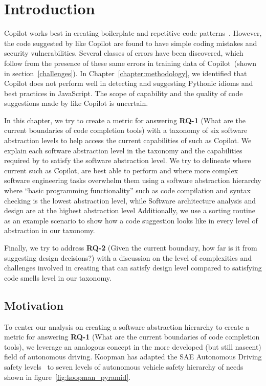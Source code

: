 \label{chapter:framework}

\section{Introduction}
Copilot works best in creating boilerplate and repetitive code patterns~\cite{Copilot-web}.
However, the code suggested by \cct{} like Copilot are found to have simple coding mistakes and security vulnerabilities. Several classes of errors have been discovered, which follow from the presence of these same errors in training data of Copilot~(shown in section~\ref{challenges}).
In Chapter~\ref{chapter:methodology}, we identified that Copilot does not perform well in detecting and suggesting Pythonic idioms and best practices in JavaScript.
The scope of capability and the quality of code suggestions made by \cct{} like Copilot is uncertain. 

In this chapter, we try to create a metric for answering \textbf{RQ-1} (What are the current boundaries of code completion tools) with a taxonomy of six software abstraction levels to help access the current capabilities of \cct{} such as Copilot. 
We explain each software abstraction level in the taxonomy and the capabilities required by \cct{} to satisfy the software abstraction level. 
We try to delineate where current \cct{} such as Copilot, are best able to perform and where more complex software engineering tasks overwhelm them using a software abstraction hierarchy where ``basic programming functionality'' such as code compilation and syntax checking is the lowest abstraction
level, while Software architecture analysis and design are at the highest abstraction
level
Additionally, we use a sorting routine as an example scenario to show how a \cct{} code suggestion looks like in every level of abstraction in our taxonomy.

Finally, we try to address \textbf{RQ-2} (Given the current boundary, how far is it from suggesting design decisions?) with a discussion on the level of complexities and challenges involved in creating \cct{} that can satisfy design level compared to \cct{} satisfying code smells level in our taxonomy.

\subsection{Motivation}
To center our analysis on creating a software abstraction hierarchy to create a metric for answering \textbf{RQ-1} (What are the current boundaries of code completion tools), 
we leverage an analogous concept in the more developed (but still nascent) field of autonomous driving. 
Koopman has adapted the SAE Autonomous Driving safety levels~\cite{sae} to seven levels of autonomous vehicle safety hierarchy of needs shown in figure~\ref{fig:koopman_pyramid}. 


